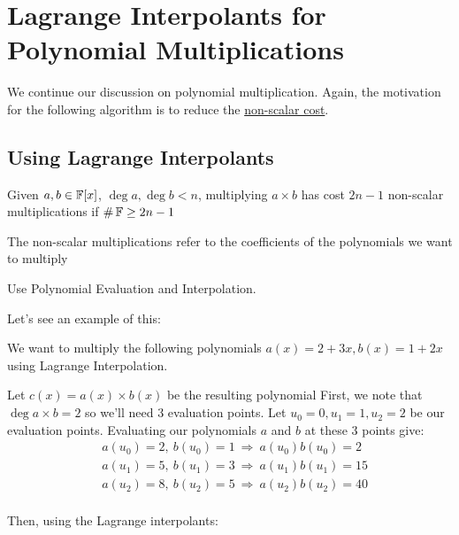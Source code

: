 
\section{Lagrange Interpolants for Polynomial Multiplications}
We continue our discussion on polynomial multiplication.
Again, the motivation for the following algorithm is to reduce the \underline{non-scalar cost}.

\subsection{Using Lagrange Interpolants}
\begin{theorem}{}{}
    Given $a,b \in \operatorname{\mathbb{F}}[x]$, $\deg a, \deg b < n$, multiplying $a \times b$ has cost $2n - 1$ non-scalar multiplications if $\#\operatorname{\mathbb{F}} \geq 2n - 1$
\end{theorem}
\begin{note}
    The non-scalar multiplications refer to the coefficients of the polynomials we want to multiply
\end{note}

\begin{idea}
Use Polynomial Evaluation and Interpolation.
\end{idea}
Let's see an example of this:

\begin{example}{}{}
    We want to multiply the following polynomials $a(x) = 2 + 3x, b(x) = 1 + 2x$ using Lagrange Interpolation.

    Let $c(x) = a(x) \times b(x)$ be the resulting polynomial
    First, we note that $\deg a \times b = 2$ so we'll need 3 evaluation points.
    Let $u_0 = 0, u_1 = 1, u_2 = 2$ be our evaluation points.
    Evaluating our polynomials $a$ and $b$ at these 3 points give:
    \begin{align*}
        &a(u_0) = 2, \ b(u_0) = 1 \ \Rightarrow \ a(u_0)b(u_0) = 2 \\
        &a(u_1) = 5, \ b(u_1) = 3 \ \Rightarrow \ a(u_1)b(u_1) = 15 \\
        &a(u_2) = 8, \ b(u_2) = 5 \ \Rightarrow \ a(u_2)b(u_2) = 40 \\
    \end{align*}

    Then, using the Lagrange interpolants:  
        
\end{example}